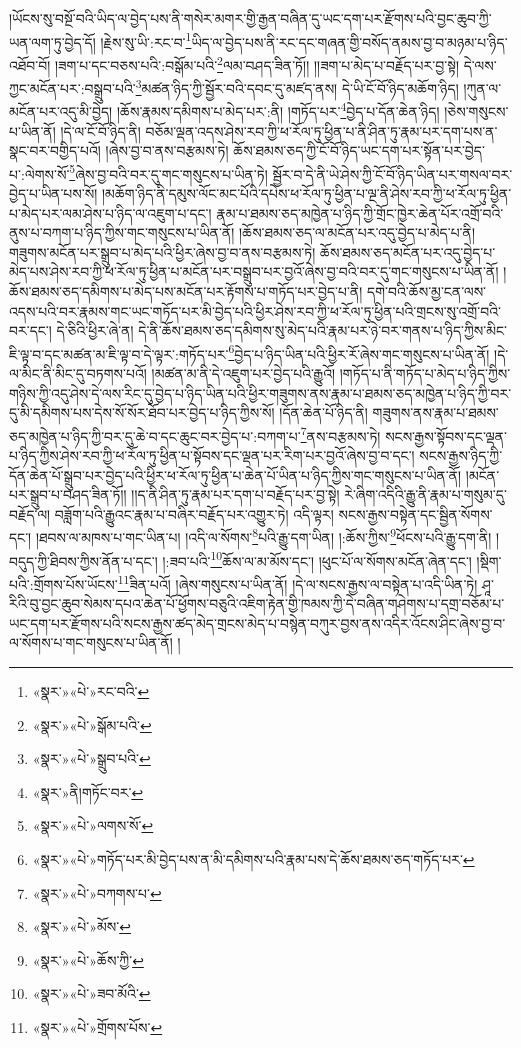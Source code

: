 །ཡོངས་སུ་བསྔོ་བའི་ཡིད་ལ་བྱེད་པས་ནི་གསེར་མགར་གྱི་རྒྱན་བཞིན་དུ་ཡང་དག་པར་རྫོགས་པའི་བྱང་ཆུབ་ཀྱི་ཡན་ལག་ཏུ་བྱེད་དོ། །རྗེས་སུ་ཡི་:རང་བ་\footnote{«སྣར་»«པེ་»རང་བའི་}ཡིད་ལ་བྱེད་པས་ནི་རང་དང་གཞན་གྱི་བསོད་ནམས་བྱ་བ་མཉམ་པ་ཉིད་འཐོབ་བོ། །ཟག་པ་དང་བཅས་པའི་:བསྒོམ་པའི་\footnote{«སྣར་»«པེ་»སྒོམ་པའི་}ལམ་བཤད་ཟིན་ཏོ།། །།ཟག་པ་མེད་པ་བརྗོད་པར་བྱ་སྟེ། དེ་ལས་ཀྱང་མངོན་པར་:བསྒྲུབ་པའི་\footnote{«སྣར་»«པེ་»སྒྲུབ་པའི་}མཚན་ཉིད་ཀྱི་སྦྱོར་བའི་དབང་དུ་མཛད་ནས། དེ་ཡི་ངོ་བོ་ཉིད་མཆོག་ཉིད། །ཀུན་ལ་མངོན་པར་འདུ་མི་བྱེད། །ཆོས་རྣམས་དམིགས་པ་མེད་པར་:ནི། །གཏོད་པར་\footnote{«སྣར་»ནི།གཏོང་བར་}བྱེད་པ་དོན་ཆེན་ཉིད། །ཅེས་གསུངས་པ་ཡིན་ནོ། །དེ་ལ་ངོ་བོ་ཉིད་ནི། བཅོམ་ལྡན་འདས་ཤེས་རབ་ཀྱི་ཕ་རོལ་ཏུ་ཕྱིན་པ་ནི་ཤིན་ཏུ་རྣམ་པར་དག་པས་ན་སྣང་བར་བགྱིད་པའོ། །ཞེས་བྱ་བ་ནས་བརྩམས་ཏེ། ཆོས་ཐམས་ཅད་ཀྱི་ངོ་བོ་ཉིད་ཡང་དག་པར་སྟོན་པར་བྱེད་པ་:ལེགས་སོ་\footnote{«སྣར་»«པེ་»ལགས་སོ་}ཞེས་བྱ་བའི་བར་དུ་གང་གསུངས་པ་ཡིན་ཏེ། སྦྱོར་བ་དེ་ནི་ཡེ་ཤེས་ཀྱི་ངོ་བོ་ཉིད་ཡིན་པར་གསལ་བར་བྱེད་པ་ཡིན་པས་སོ། །མཆོག་ཉིད་ནི་དམུས་ལོང་མང་པོའི་དཔེས་ཕ་རོལ་ཏུ་ཕྱིན་པ་ལྔ་ནི་ཤེས་རབ་ཀྱི་ཕ་རོལ་ཏུ་ཕྱིན་པ་མེད་པར་ལམ་ཤེས་པ་ཉིད་ལ་འཇུག་པ་དང་། རྣམ་པ་ཐམས་ཅད་མཁྱེན་པ་ཉིད་ཀྱི་གྲོང་ཁྱེར་ཆེན་པོར་འགྲོ་བའི་ནུས་པ་བཀག་པ་ཉིད་ཀྱིས་གང་གསུངས་པ་ཡིན་ནོ། །ཆོས་ཐམས་ཅད་ལ་མངོན་པར་འདུ་བྱེད་པ་མེད་པ་ནི། གཟུགས་མངོན་པར་སྒྲུབ་པ་མེད་པའི་ཕྱིར་ཞེས་བྱ་བ་ནས་བརྩམས་ཏེ། ཆོས་ཐམས་ཅད་མངོན་པར་འདུ་བྱེད་པ་མེད་པས་ཤེས་རབ་ཀྱི་ཕ་རོལ་ཏུ་ཕྱིན་པ་མངོན་པར་བསྒྲུབ་པར་བྱའོ་ཞེས་བྱ་བའི་བར་དུ་གང་གསུངས་པ་ཡིན་ནོ། །ཆོས་ཐམས་ཅད་དམིགས་པ་མེད་པས་མངོན་པར་རྟོགས་པ་གཏོད་པར་བྱེད་པ་ནི། དགེ་བའི་ཆོས་མྱ་ངན་ལས་འདས་པའི་བར་རྣམས་གང་ཡང་གཏོད་པར་མི་བྱེད་པའི་ཕྱིར་ཤེས་རབ་ཀྱི་ཕ་རོལ་ཏུ་ཕྱིན་པའི་གྲངས་སུ་འགྲོ་བའི་བར་དང་། དེ་ཅིའི་ཕྱིར་ཞེ་ན། དེ་ནི་ཆོས་ཐམས་ཅད་དམིགས་སུ་མེད་པའི་རྣམ་པར་ཉེ་བར་གནས་པ་ཉིད་ཀྱིས་མིང་ཇི་ལྟ་བ་དང་མཚན་མ་ཇི་ལྟ་བ་དེ་ལྟར་:གཏོད་པར་\footnote{«སྣར་»«པེ་»གཏོད་པར་མི་བྱེད་པས་ན་མི་དམིགས་པའི་རྣམ་པས་དེ་ཆོས་ཐམས་ཅད་གཏོད་པར་}བྱེད་པ་ཉིད་ཡིན་པའི་ཕྱིར་རོ་ཞེས་གང་གསུངས་པ་ཡིན་ནོ། །དེ་ལ་མིང་ནི་མིང་དུ་བཏགས་པའོ། །མཚན་མ་ནི་དེ་འཇུག་པར་བྱེད་པའི་རྒྱུའོ། །གཏོད་པ་ནི་གཏོད་པ་མེད་པ་ཉིད་ཀྱིས་གཉིས་ཀྱི་འདུ་ཤེས་དེ་ལས་རིང་དུ་བྱེད་པ་ཉིད་ཡིན་པའི་ཕྱིར་གཟུགས་ནས་རྣམ་པ་ཐམས་ཅད་མཁྱེན་པ་ཉིད་ཀྱི་བར་དུ་མི་དམིགས་པས་དེས་སོ་སོར་ཐོབ་པར་བྱེད་པ་ཉིད་ཀྱིས་སོ། །དོན་ཆེན་པོ་ཉིད་ནི། གཟུགས་ནས་རྣམ་པ་ཐམས་ཅད་མཁྱེན་པ་ཉིད་ཀྱི་བར་དུ་ཆེ་བ་དང་ཆུང་བར་བྱེད་པ་:བཀག་པ་\footnote{«སྣར་»«པེ་»བཀགས་པ་}ནས་བརྩམས་ཏེ། སངས་རྒྱས་སྟོབས་དང་ལྡན་པ་ཉིད་ཀྱིས་ཤེས་རབ་ཀྱི་ཕ་རོལ་ཏུ་ཕྱིན་པ་སྟོབས་དང་ལྡན་པར་རིག་པར་བྱའོ་ཞེས་བྱ་བ་དང་། སངས་རྒྱས་ཉིད་ཀྱི་དོན་ཆེན་པོ་སྒྲུབ་པར་བྱེད་པའི་ཕྱིར་ཕ་རོལ་ཏུ་ཕྱིན་པ་ཆེན་པོ་ཡིན་པ་ཉིད་ཀྱིས་གང་གསུངས་པ་ཡིན་ནོ། །མངོན་པར་སྒྲུབ་པ་བཤད་ཟིན་ཏོ།། །།ད་ནི་ཤིན་ཏུ་རྣམ་པར་དག་པ་བརྗོད་པར་བྱ་སྟེ། རེ་ཞིག་འདིའི་རྒྱུ་ནི་རྣམ་པ་གསུམ་དུ་བརྗོད་ལ། བཟློག་པའི་རྒྱུའང་རྣམ་པ་བཞིར་བརྗོད་པར་འགྱུར་ཏེ། འདི་ལྟར། སངས་རྒྱས་བསྟེན་དང་སྦྱིན་སོགས་དང་། །ཐབས་ལ་མཁས་པ་གང་ཡིན་པ། །འདི་ལ་སོགས་\footnote{«སྣར་»«པེ་»མོས་}པའི་རྒྱུ་དག་ཡིན། །:ཆོས་ཀྱིས་\footnote{«སྣར་»«པེ་»ཆོས་ཀྱི་}ཕོངས་པའི་རྒྱུ་དག་ནི། །བདུད་ཀྱི་ཐིབས་ཀྱིས་ནོན་པ་དང་། །:ཟབ་པའི་\footnote{«སྣར་»«པེ་»ཟབ་མོའི་}ཆོས་ལ་མ་མོས་དང་། །ཕུང་པོ་ལ་སོགས་མངོན་ཞེན་དང་། །སྡིག་པའི་:གྲོགས་པོས་ཡོངས་\footnote{«སྣར་»«པེ་»གྲོགས་པོས་}ཟིན་པའོ། །ཞེས་གསུངས་པ་ཡིན་ནོ། །དེ་ལ་སངས་རྒྱས་ལ་བསྟེན་པ་འདི་ཡིན་ཏེ། ཤཱ་རིའི་བུ་བྱང་ཆུབ་སེམས་དཔའ་ཆེན་པོ་ཕྱོགས་བཅུའི་འཇིག་རྟེན་གྱི་ཁམས་ཀྱི་དེ་བཞིན་གཤེགས་པ་དགྲ་བཅོམ་པ་ཡང་དག་པར་རྫོགས་པའི་སངས་རྒྱས་ཚད་མེད་གྲངས་མེད་པ་བསྙེན་བཀུར་བྱས་ནས་འདིར་འོངས་ཤིང་ཞེས་བྱ་བ་ལ་སོགས་པ་གང་གསུངས་པ་ཡིན་ནོ། །

